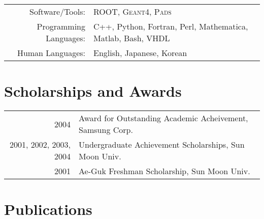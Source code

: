 \documentclass[a4paper,10pt]{article} %
\begin{document}
\begin{tabular}{rl}
	Software/Tools: & \textsc{ROOT}, \textsc{Geant4}, \textsc{Pads}\\
	Programming Languages: & C++, Python, Fortran, Perl, Mathematica, Matlab, Bash, VHDL\\
	Human Languages: & English, Japanese, Korean
\end{tabular}


\section{Scholarships and Awards}

\begin{tabular}{rl}
	2004 & Award for Outstanding Academic Acheivement, Samsung Corp.\\
	2001, 2002, 2003, 2004 & Undergraduate Achievement Scholarships, Sun Moon
	Univ.\\
	2001 & Ae-Guk Freshman Scholarship, Sun Moon Univ.\\
\end{tabular}


%
%


\section{Publications}
\end{document}
